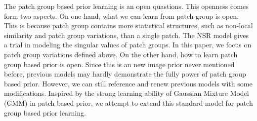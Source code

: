 \documentclass[10pt,twocolumn,letterpaper]{article}
\begin{document}
The patch group based prior learning is an open quastions. This openness comes form two aspects. On one hand, what we can learn from patch group is open. This is because patch group contains more statistical structures, such as non-local similarity and patch group variations, than a single patch. The NSR model\cite{nsr} gives a trial in modeling the singular values of patch groups. In this paper, we focus on patch group variations defined above. On the other hand, how to learn patch group based prior is open. Since this is an new image prior never mentioned before, previous models may hardly demonstrate the fully power of patch group based prior. However, we can still reference and renew previous models with some modifications. Inspired by the strong learning ability of Gaussian Mixture Model (GMM) in patch based prior\cite{epll}, we attempt to extend this standard model for patch group based prior learning.
\end{document}
